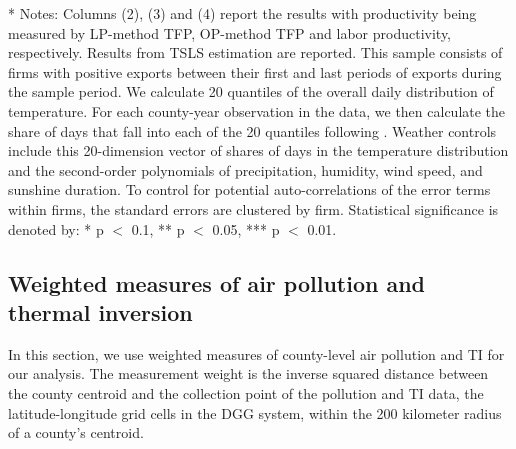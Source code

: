 \documentclass[12pt]{article}
\begin{document}
\begin{table}[H]
      \begin{tablenotes}
        \item[*] \small Notes: Columns (2), (3) and (4) report the results with productivity being measured by LP-method TFP, OP-method TFP and labor productivity, respectively. Results from TSLS estimation are reported. This sample consists of firms with positive exports between their first and last periods of exports during the sample period. We calculate 20 quantiles of the overall daily distribution of temperature. For each county-year observation in the data, we then calculate the share of days that fall into each of the 20 quantiles following \citep{deschenes2017defensive}. Weather controls include this 20-dimension vector of shares of days in the temperature distribution and the second-order polynomials of precipitation, humidity, wind speed, and sunshine duration. To control for potential auto-correlations of the error terms within firms, the standard errors are clustered by firm. Statistical significance is denoted by: * p $<$ 0.1, ** p $<$ 0.05, *** p $<$ 0.01.
      \end{tablenotes}
      \end{table}
      
      \subsection{Weighted measures of air pollution and thermal inversion}
      In this section, we use weighted measures of county-level air pollution and TI for our analysis. The measurement weight is the inverse squared distance between  the county centroid and the collection point of the pollution and TI data, the latitude-longitude grid cells in the DGG system, within the 200 kilometer radius of a county's centroid.  
      
\end{document}
